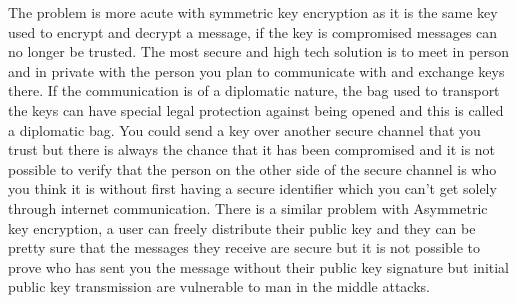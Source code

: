 The problem is more acute with symmetric key encryption as it is the same key used to encrypt and decrypt a message, if the key is compromised messages can no longer be trusted. The most secure and high tech solution is to meet in person and in private with the person you plan to communicate with and exchange keys there. If the communication is of a diplomatic nature, the bag used to transport the keys can have special legal protection against being opened and this is called a diplomatic bag\cite{dipbag}. You could send a key over another secure channel that you trust but there is always the chance that it has been compromised and it is not possible to verify that the person on the other side of the secure channel is who you think it is without first having a secure identifier which you can't get solely through internet communication. There is a similar problem with Asymmetric key encryption, a user can freely distribute their public key and they can be pretty sure that the messages they receive are secure but it is not possible to prove who has sent you the message without their public key signature but initial public key transmission are vulnerable to man in the middle attacks.
